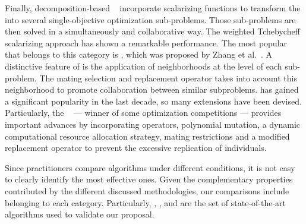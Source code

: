Finally, decomposition-based \MOEAS{}~\cite{ishibuchi1998multi} incorporate scalarizing functions to transform the \MOP{} 
into several single-objective optimization sub-problems.
%
Those sub-problems are then solved in a simultaneously and collaborative way.
%
The weighted Tchebycheff scalarizing approach has shown a remarkable performance.
%
The most popular \MOEA{} that belongs to this category is \MOEAD{}, which was proposed by Zhang et al.~\cite{zhang2007moea}.
%
A distinctive feature of \MOEAD{} is the application of neighborhoods at the level of each sub-problem.
%
The mating selection and replacement operator takes into account this neighborhood to promote collaboration
between similar subproblems.
%
\MOEAD{} has gained a significant popularity in the last decade, so many extensions have been devised.
%
Particularly, the \MOEADDE{}~\cite{li2009multiobjective} --- winner of some optimization competitions --- provides
important advances by incorporating \DE{} operators, polynomial mutation, a dynamic computational resource allocation strategy, 
mating restrictions and a modified replacement operator to prevent the excessive replication of individuals. 

Since practitioners compare algorithms under different conditions, it is not easy to clearly identify the most effective ones.
%
Given the complementary properties contributed by the different discussed methodologies, our comparisons include \MOEAS{} belonging
to each category. Particularly, \NSGAII{}, \NSGAIII{}, \RMOEA{} and \MOEADDE{} are the set of state-of-the-art algorithms used
to validate our proposal.
